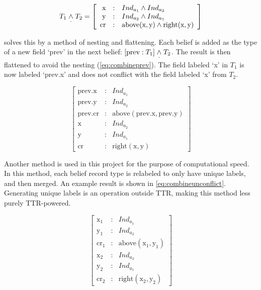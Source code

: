 \begin{equation} \label{eq:merge}
T_1  \mathrel{\underset\cdot\wedge} T_2 =
\left[\begin{array}{rcl}
    \text{x} &:& Ind_{a_1} \wedge Ind_{a_2} \\
    \text{y} &:& Ind_{a_2} \wedge Ind_{a_1} \\
    \text{cr} &:& \text{above}(\text{x}, \text{y}) \wedge \text{right}(\text{x}, \text{y})
    \end{array}\right]
\end{equation}

\cite{CooperTypetheorylanguage2016} solves this by a method of nesting and flattening.
Each belief is added as the type of a new field `prev' in the next belief: $[\text{prev} : T_1] \mathrel{\underset\cdot\wedge} T_2$.
The result is then flattened to avoid the nesting (\autoref{eq:combineprev}).
The field labeled `x' in $T_1$ is now labeled `prev.x' and does not conflict with the field labeled `x' from $T_2$.

\begin{equation} \label{eq:combineprev}
\left[\begin{array}{rcl}
    \text{prev.x} &:& Ind_{a_1} \\
    \text{prev.y} &:& Ind_{a_2} \\
    \text{prev.cr} &:& \text{above}(\text{prev.x}, \text{prev.y}) \\
    \text{x} &:& Ind_{a_2} \\
    \text{y} &:& Ind_{a_1} \\
    \text{cr} &:& \text{right}(\text{x}, \text{y})
    \end{array}\right]
\end{equation}

Another method is used in this project for the purpose of computational speed.
In this method, each belief record type is relabeled to only have unique labels, and then merged.
An example result is shown in \autoref{eq:combineunconflict}.
Generating unique labels is an operation outside TTR, making this method less purely TTR-powered.

\begin{equation} \label{eq:combineunconflict}
\left[\begin{array}{rcl}
    \text{x}_1 &:& Ind_{a_1} \\
    \text{y}_1 &:& Ind_{a_2} \\
    \text{cr}_1 &:& \text{above}(\text{x}_1, \text{y}_1) \\
    \text{x}_2 &:& Ind_{a_2} \\
    \text{y}_2 &:& Ind_{a_1} \\
    \text{cr}_2 &:& \text{right}(\text{x}_2, \text{y}_2)
    \end{array}\right]
\end{equation}

